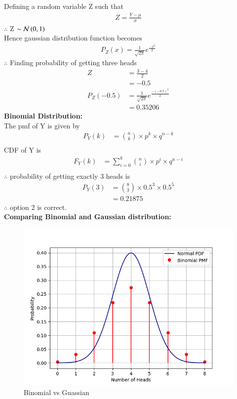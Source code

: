 \documentclass[journal,12pt,twocolumn]{IEEEtran}
\theoremstyle{remark}
\begin{document}
Defining a random variable Z such that
\begin{align}
	Z = \frac{Y-\mu}{\sigma}
\end{align}
$\therefore$ Z $\sim \mathcal{N}\left(0,1\right)$\\
Hence gaussian distribution function becomes
\begin{align}
	P_Z(x) = \frac{1}{\sqrt{2\pi}}e^{\frac{-x^2}{2}}
\end{align}
$\therefore$ Finding probability of getting three heads
\begin{align}
	Z &= \frac{3-4}{2}\\
	&= -0.5\\
	P_Z(-0.5) &= \frac{1}{\sqrt{2\pi}}e^{\frac{-(-0.5)^2}{2}}\\
	&= 0.35206
\end{align}
\textbf{Binomial Distribution:}\\
The pmf of Y is given by
\begin{align}
	P_Y(k) &= \binom{n}{k} \times p^k\times q^{n-k}\\
\end{align}
CDF of Y is
\begin{align}
	F_Y(k) &= \sum_{i=0}^k \binom{n}{i} \times p^i\times q^{n-i}\\
\end{align}
$\therefore$ probability of getting exactly 3 heads is 
\begin{align}
	P_Y(3) &= \binom{8}{3} \times 0.5^3\times 0.5^{5}\\
	&= 0.21875
\end{align}
$\therefore$ option 2 is correct.\\
\textbf{Comparing Binomial and Gaussian distribution:}
\begin{figure}[H]
\includegraphics[width=\columnwidth]{./figs/fig.png}
\caption{Binomial vs Guassian}
\end{figure}
\end{document}
